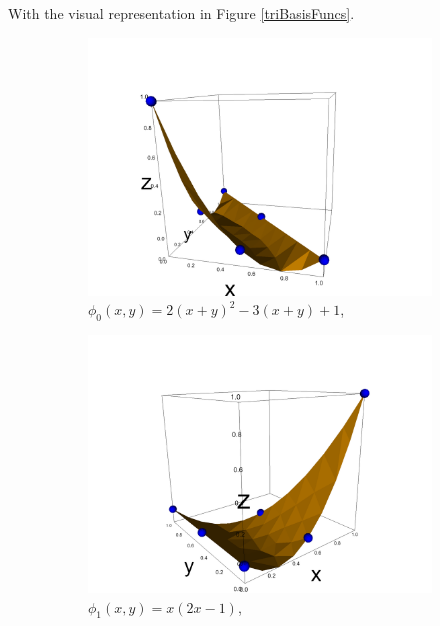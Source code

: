 \documentclass[12pt]{ociamthesis}
\begin{document}
With the visual representation in Figure \ref{triBasisFuncs}.
\begin{figure}[H]
 \begin{subfigure}{0.5\textwidth}
     \includegraphics[width=\textwidth]{Pics/BasisFunc/triBasis0.png}
     \caption{$\phi_0(x,y) = 2(x+y)^2 - 3(x+y) + 1$,}
 \end{subfigure}
 \hfill
 \begin{subfigure}{0.5\textwidth}
     \includegraphics[width=\textwidth]{Pics/BasisFunc/triBasis1.png}
     \caption{$\phi_1(x,y) = x(2x-1)$,}
 \end{subfigure}
 \hfill
 \begin{subfigure}{0.5\textwidth}

\end{subfigure}
\end{figure}
\end{document}
